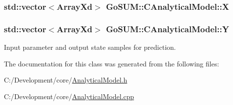 \hypertarget{class_go_s_u_m_1_1_c_analytical_model_aebd4e3617cb5a88d6d3b3bca772cea10}{
\subsubsection[{X}]{\setlength{\rightskip}{0pt plus 5cm}std\-::vector$<$Array\-Xd$>$ Go\-S\-U\-M\-::\-C\-Analytical\-Model\-::\-X\hspace{0.3cm}{\ttfamily [private]}}}\label{class_go_s_u_m_1_1_c_analytical_model_aebd4e3617cb5a88d6d3b3bca772cea10}
\hypertarget{class_go_s_u_m_1_1_c_analytical_model_ac5eeddbe5c0117e14768bc020b493709}{
\subsubsection[{Y}]{\setlength{\rightskip}{0pt plus 5cm}std\-::vector$<$Array\-Xd$>$ Go\-S\-U\-M\-::\-C\-Analytical\-Model\-::\-Y\hspace{0.3cm}{\ttfamily [private]}}}\label{class_go_s_u_m_1_1_c_analytical_model_ac5eeddbe5c0117e14768bc020b493709}
Input parameter and output state samples for prediction. 

The documentation for this class was generated from the following files\-:\begin{DoxyCompactItemize}
\item 
C\-:/\-Development/core/\hyperlink{_analytical_model_8h}{Analytical\-Model.\-h}\item 
C\-:/\-Development/core/\hyperlink{_analytical_model_8cpp}{Analytical\-Model.\-cpp}\end{DoxyCompactItemize}
